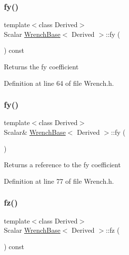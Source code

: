 \subsubsection{\texorpdfstring{fy()}{fy()}\hspace{0.1cm}{\footnotesize\ttfamily [1/2]}}
{\footnotesize\ttfamily template$<$class Derived$>$ \\
Scalar \hyperlink{class_wrench_base}{Wrench\+Base}$<$ Derived $>$\+::fy (\begin{DoxyParamCaption}{ }\end{DoxyParamCaption}) const\hspace{0.3cm}{\ttfamily [inline]}}

\begin{DoxyReturn}{Returns}
the {\ttfamily fy} coefficient 
\end{DoxyReturn}


Definition at line 64 of file Wrench.\+h.

\hypertarget{class_wrench_base_a3e763c1e4c335d4f13e45a1a1a05c7f3}{}\label{class_wrench_base_a3e763c1e4c335d4f13e45a1a1a05c7f3} 
\subsubsection{\texorpdfstring{fy()}{fy()}\hspace{0.1cm}{\footnotesize\ttfamily [2/2]}}
{\footnotesize\ttfamily template$<$class Derived$>$ \\
Scalar\& \hyperlink{class_wrench_base}{Wrench\+Base}$<$ Derived $>$\+::fy (\begin{DoxyParamCaption}{ }\end{DoxyParamCaption})\hspace{0.3cm}{\ttfamily [inline]}}

\begin{DoxyReturn}{Returns}
a reference to the {\ttfamily fy} coefficient 
\end{DoxyReturn}


Definition at line 77 of file Wrench.\+h.

\hypertarget{class_wrench_base_a045d6010d317ce4ee578bfcf1f0162c7}{}\label{class_wrench_base_a045d6010d317ce4ee578bfcf1f0162c7} 
\subsubsection{\texorpdfstring{fz()}{fz()}\hspace{0.1cm}{\footnotesize\ttfamily [1/2]}}
{\footnotesize\ttfamily template$<$class Derived$>$ \\
Scalar \hyperlink{class_wrench_base}{Wrench\+Base}$<$ Derived $>$\+::fz (\begin{DoxyParamCaption}{ }\end{DoxyParamCaption}) const\hspace{0.3cm}{\ttfamily [inline]}}

